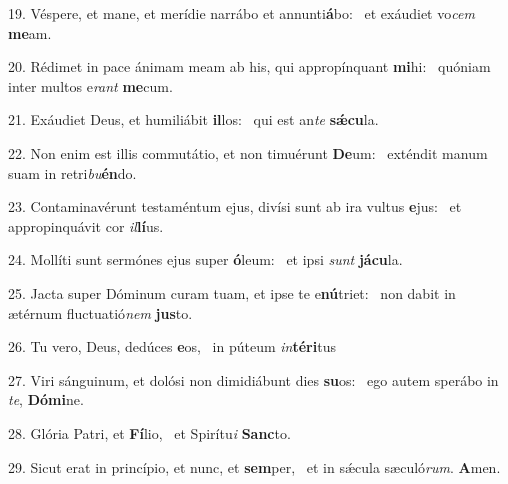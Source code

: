 19. Véspere, et mane, et merídie narrábo et annunti\textbf{á}bo: \ast\  et exáudiet vo\textit{cem} \textbf{me}am.\

20. Rédimet in pace ánimam meam ab his, qui appropínquant \textbf{mi}hi: \ast\  quóniam inter multos e\textit{rant} \textbf{me}cum.\

21. Exáudiet Deus, et humiliábit \textbf{il}los: \ast\  qui est an\textit{te} \textbf{sǽ}\textbf{cu}la.\

22. Non enim est illis commutátio, et non timuérunt \textbf{De}um: \ast\  exténdit manum suam in retri\textit{bu}\textbf{én}do.\

23. Contaminavérunt testaméntum ejus, divísi sunt ab ira vultus \textbf{e}jus: \ast\  et appropinquávit cor \textit{il}\textbf{lí}us.\

24. Mollíti sunt sermónes ejus super \textbf{ó}leum: \ast\  et ipsi \textit{sunt} \textbf{já}\textbf{cu}la.\

25. Jacta super Dóminum curam tuam, et ipse te e\textbf{nú}triet: \ast\  non dabit in ætérnum fluctuatió\textit{nem} \textbf{jus}to.\

26. Tu vero, Deus, dedúces \textbf{e}os, \ast\  in púteum \textit{in}\textbf{tér}\textbf{i}tus\

27. Viri sánguinum, et dolósi non dimidiábunt dies \textbf{su}os: \ast\  ego autem sperábo in \textit{te}, \textbf{Dó}\textbf{mi}ne.\

28. Glória Patri, et \textbf{Fí}lio, \ast\  et Spirítu\textit{i} \textbf{Sanc}to.\

29. Sicut erat in princípio, et nunc, et \textbf{sem}per, \ast\  et in sǽcula sæculó\textit{rum}. \textbf{A}men.\

